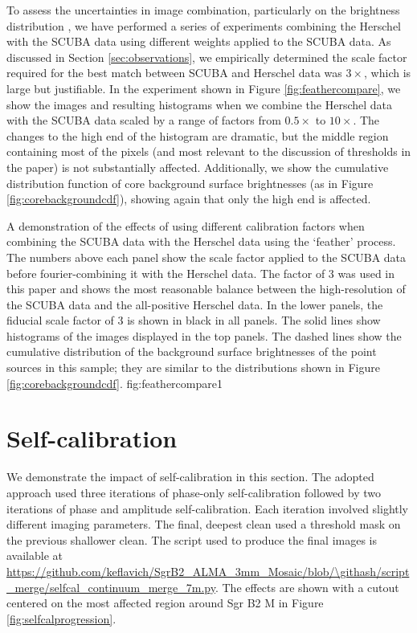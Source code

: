 \documentclass[twocolumn]{aastex61}
\begin{document}
To assess the uncertainties in image combination, particularly on the
brightness distribution \citep[e.g.,][]{Ossenkopf-Okada2016a}, we have performed
a series of experiments combining the Herschel with the SCUBA data using
different weights applied to the SCUBA data.  As discussed in Section
\ref{sec:observations}, we empirically determined the scale factor required for
the best match between SCUBA and Herschel data was $3\times$, which is
 large but justifiable.  In the experiment shown in Figure
\ref{fig:feathercompare}, we show the images and resulting histograms when we
combine the Herschel data with the SCUBA data scaled by a range of factors from
$0.5\times$ to $10\times$.  The changes to the high end of the histogram are
dramatic, but the middle region containing most of the pixels (and most
relevant to the discussion of thresholds in the paper) is not substantially affected.
Additionally, we show the cumulative distribution function of core background
surface brightnesses (as in Figure \ref{fig:corebackgroundcdf}), showing again
that only the high end is affected. 

{A demonstration of the effects of using different calibration factors when
combining the SCUBA data with the Herschel data using the `feather' process.
The numbers above each panel show the scale factor applied to the SCUBA data
before fourier-combining it with the Herschel data.  The factor of 3 was used
in this paper and shows the most reasonable balance between the high-resolution
of the SCUBA data and the all-positive Herschel data.  In the lower panels, the
fiducial scale factor of 3 is shown in black in all panels.  The solid lines
show histograms of the images displayed in the top panels.  The dashed lines
show the cumulative distribution of the background surface brightnesses of the
point sources in this sample; they are similar to the distributions shown in
Figure \ref{fig:corebackgroundcdf}.}
{fig:feathercompare}{1}{\textwidth}

\section{Self-calibration}
\label{sec:selfcal}
We demonstrate the impact of self-calibration in this section.  The adopted approach
used three iterations of phase-only self-calibration followed by two iterations of
phase and amplitude self-calibration.  Each iteration involved slightly
different imaging parameters.  The final, deepest clean used a threshold mask
on the previous shallower clean. The script used to produce the final images is
available at
\url{https://github.com/keflavich/SgrB2_ALMA_3mm_Mosaic/blob/\githash/script_merge/selfcal_continuum_merge_7m.py}.
The effects are shown with a cutout centered on the most affected region around
Sgr B2 M in Figure \ref{fig:selfcalprogression}.
\end{document}

